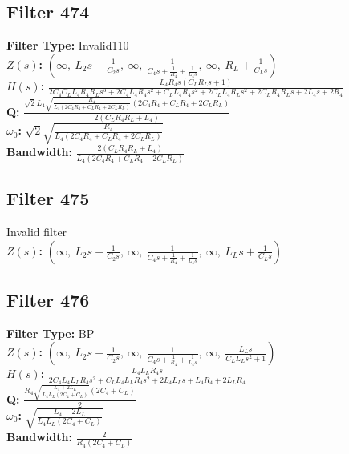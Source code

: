 \documentclass{article}
\begin{document}
\subsection*{Filter 474}
\textbf{Filter Type:} Invalid110 \\ 
\textbf{$Z(s)$:} $\left( \infty, \  L_{2} s + \frac{1}{C_{2} s}, \  \infty, \  \frac{1}{C_{4} s + \frac{1}{R_{4}} + \frac{1}{L_{4} s}}, \  \infty, \  R_{L} + \frac{1}{C_{L} s}\right)$ \\ 
\textbf{$H(s)$:} $\frac{L_{4} R_{4} s \left(C_{L} R_{L} s + 1\right)}{2 C_{4} C_{L} L_{4} R_{4} R_{L} s^{3} + 2 C_{4} L_{4} R_{4} s^{2} + C_{L} L_{4} R_{4} s^{2} + 2 C_{L} L_{4} R_{L} s^{2} + 2 C_{L} R_{4} R_{L} s + 2 L_{4} s + 2 R_{4}}$ \\ 
\textbf{Q:} $\frac{\sqrt{2} L_{4} \sqrt{\frac{R_{4}}{L_{4} \left(2 C_{4} R_{4} + C_{L} R_{4} + 2 C_{L} R_{L}\right)}} \left(2 C_{4} R_{4} + C_{L} R_{4} + 2 C_{L} R_{L}\right)}{2 \left(C_{L} R_{4} R_{L} + L_{4}\right)}$ \\ 
\textbf{$\omega_0$:} $\sqrt{2} \sqrt{\frac{R_{4}}{L_{4} \left(2 C_{4} R_{4} + C_{L} R_{4} + 2 C_{L} R_{L}\right)}}$ \\ 
\textbf{Bandwidth:} $\frac{2 \left(C_{L} R_{4} R_{L} + L_{4}\right)}{L_{4} \left(2 C_{4} R_{4} + C_{L} R_{4} + 2 C_{L} R_{L}\right)}$ \\ 
\subsection*{Filter 475}
Invalid filter \\ 
\textbf{$Z(s)$:} $\left( \infty, \  L_{2} s + \frac{1}{C_{2} s}, \  \infty, \  \frac{1}{C_{4} s + \frac{1}{R_{4}} + \frac{1}{L_{4} s}}, \  \infty, \  L_{L} s + \frac{1}{C_{L} s}\right)$ \\ 
\subsection*{Filter 476}
\textbf{Filter Type:} BP \\ 
\textbf{$Z(s)$:} $\left( \infty, \  L_{2} s + \frac{1}{C_{2} s}, \  \infty, \  \frac{1}{C_{4} s + \frac{1}{R_{4}} + \frac{1}{L_{4} s}}, \  \infty, \  \frac{L_{L} s}{C_{L} L_{L} s^{2} + 1}\right)$ \\ 
\textbf{$H(s)$:} $\frac{L_{4} L_{L} R_{4} s}{2 C_{4} L_{4} L_{L} R_{4} s^{2} + C_{L} L_{4} L_{L} R_{4} s^{2} + 2 L_{4} L_{L} s + L_{4} R_{4} + 2 L_{L} R_{4}}$ \\ 
\textbf{Q:} $\frac{R_{4} \sqrt{\frac{L_{4} + 2 L_{L}}{L_{4} L_{L} \left(2 C_{4} + C_{L}\right)}} \left(2 C_{4} + C_{L}\right)}{2}$ \\ 
\textbf{$\omega_0$:} $\sqrt{\frac{L_{4} + 2 L_{L}}{L_{4} L_{L} \left(2 C_{4} + C_{L}\right)}}$ \\ 
\textbf{Bandwidth:} $\frac{2}{R_{4} \left(2 C_{4} + C_{L}\right)}$ \\ 
\end{document}
